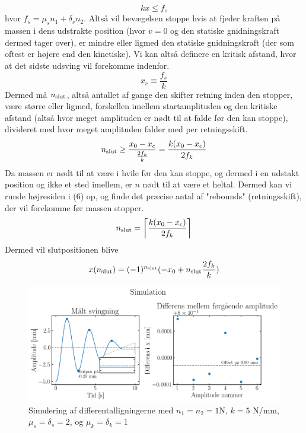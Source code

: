 \begin{equation*}
    kx \leq f_s
\end{equation*}
hvor $f_s = \mu_s n_1 + \delta_s n_2$. Altså vil bevægelsen stoppe hvis at fjeder kraften på massen i dens udstrakte position (hvor $v = 0$ og den statiske gnidningskraft dermed tager over), 
er mindre eller ligmed den statiske gnidningskraft (der som oftest er højere end den kinetiske). Vi kan altså definere en kritisk afstand, hvor at det sidste udsving vil forekomme indenfor.
\begin{equation}
    x_c \equiv \frac{f_s}{k}
\end{equation}
Dermed må $n_{\textup{slut}}$, altså antallet af gange den skifter retning inden den stopper, 
være større eller ligmed, forskellen imellem startamplituden og den kritiske afstand (altså hvor meget amplituden er nødt til at falde før den kan stoppe), divideret med hvor meget amplituden falder med per retningsskift.
\begin{equation}
    n_{\textup{slut}} \geq \frac{x_0 - x_c}{\frac{2f_k}{k}} = \frac{k(x_0 - x_c)}{2f_k}
\end{equation}
Da massen er nødt til at være i hvile før den kan stoppe, og dermed i en udstakt position og ikke et sted imellem, er $n$ nødt til at være et heltal. 
Dermed kan vi runde højresiden i (6) op, og finde det præcise antal af "rebounds" (retningsskift), der vil forekomme før massen stopper.
\begin{equation}
    n_{\textup{slut}} = \left \lceil \frac{k(x_0 - x_c)}{2f_k} \right \rceil
\end{equation}
Dermed vil slutpositionen blive
\begin{equation}
    x(n_{\textup{slut}}) = (-1)^{n_{\textup{slut}}} (-x_0 + n_{\textup{slut}} \frac{2f_k}{k})
\end{equation}
\begin{figure}[h]
    \centering
    \includegraphics[width=0.8\linewidth,origin=c]{figures/Simulation.png}
    \caption{Simulering af differentalligningerne med $n_1=n_2=1$N, $k = 5$ N/mm, $\mu_s = \delta_s = 2$, og $\mu_k = \delta_k = 1$}
    \label{fig:simulering}
\end{figure}
